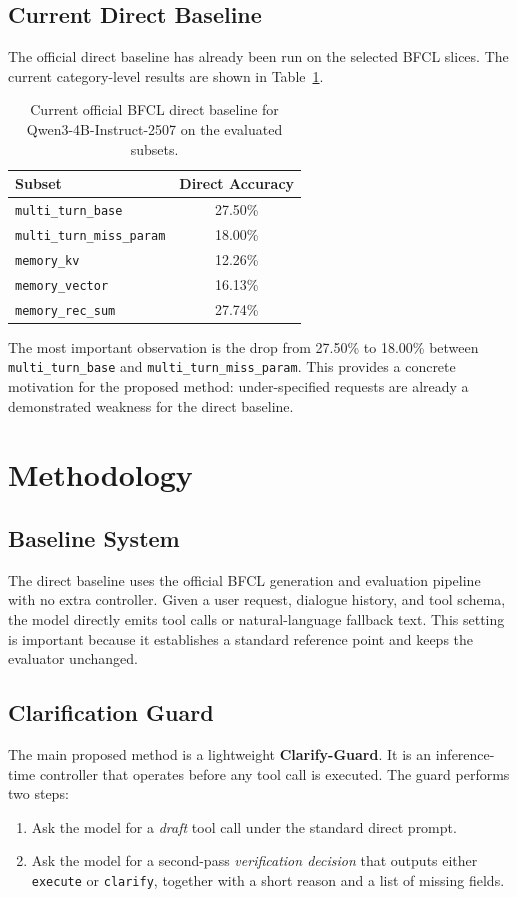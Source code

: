 \documentclass[10pt,twocolumn]{article}
\newcommand{\PrimaryModel}{Qwen3-4B-Instruct-2507}
\begin{document}
\subsection{Current Direct Baseline}
The official direct baseline has already been run on the selected BFCL slices. The current category-level results are shown in Table~\ref{tab:baseline}.

\begin{table}[t]
\centering
\small
\begin{tabular}{lc}
\toprule
Subset & Direct Accuracy \\
\midrule
\texttt{multi\_turn\_base} & 27.50\% \\
\texttt{multi\_turn\_miss\_param} & 18.00\% \\
\texttt{memory\_kv} & 12.26\% \\
\texttt{memory\_vector} & 16.13\% \\
\texttt{memory\_rec\_sum} & 27.74\% \\
\bottomrule
\end{tabular}
\caption{Current official BFCL direct baseline for \PrimaryModel{} on the evaluated subsets.}
\label{tab:baseline}
\end{table}

The most important observation is the drop from 27.50\% to 18.00\% between \texttt{multi\_turn\_base} and \texttt{multi\_turn\_miss\_param}. This provides a concrete motivation for the proposed method: under-specified requests are already a demonstrated weakness for the direct baseline.

\section{Methodology}
\subsection{Baseline System}
The direct baseline uses the official BFCL generation and evaluation pipeline with no extra controller. Given a user request, dialogue history, and tool schema, the model directly emits tool calls or natural-language fallback text. This setting is important because it establishes a standard reference point and keeps the evaluator unchanged.

\subsection{Clarification Guard}
The main proposed method is a lightweight \textbf{Clarify-Guard}. It is an inference-time controller that operates before any tool call is executed. The guard performs two steps:
\begin{enumerate}
    \item Ask the model for a \emph{draft} tool call under the standard direct prompt.
    \item Ask the model for a second-pass \emph{verification decision} that outputs either \texttt{execute} or \texttt{clarify}, together with a short reason and a list of missing fields.
\end{enumerate}
\end{document}
